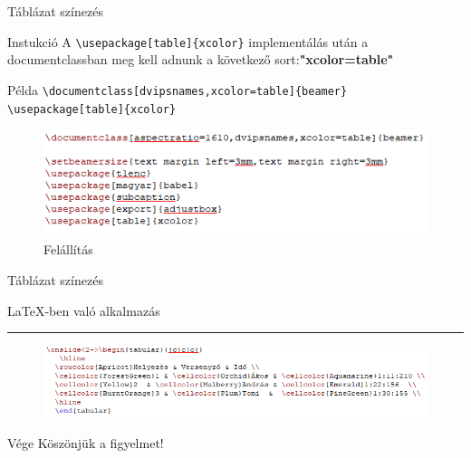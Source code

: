 \documentclass[aspectratio=1610, dvipsnames, xcolor=table]{beamer}
\begin{document}
    \begin{frame}[fragile]{Táblázat színezés}
        \begin{block}{Instukció}
            A \verb!\usepackage[table]{xcolor}! implementálás után a documentclassban meg kell adnunk a következő sort:\textbf{"xcolor=table"}
        \end{block} 
        \begin{exampleblock}{Példa}
        {
            \verb!\documentclass[dvipsnames,xcolor=table]{beamer}!
            \verb!\usepackage[table]{xcolor}!
        }
        \end{exampleblock}	
        \begin{figure}[H]
            \includegraphics[scale=0.8]{img/tablesetup.png}
            \caption{Felállítás}
        \end{figure}
    \end{frame}

    \begin{frame}[fragile]{Táblázat színezés}
    \begin{center}
        \LaTeX-ben való alkalmazás
        \noindent
        {\color{Dandelion} \rule{\linewidth}{1mm}}
    \end{center}
        \begin{figure}[H]
            \includegraphics[scale=0.8]{img/tablealkalmazas.png}        
        \end{figure}
    \end{frame}

    \begin{frame}{Vége}
        \centering \Huge Köszönjük a figyelmet!
    \end{frame}
\end{document}
